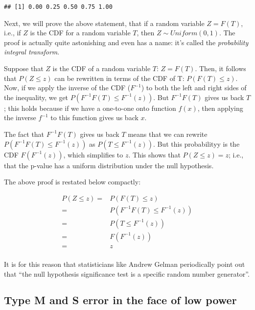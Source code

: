 \documentclass[
  12pt,
]{krantz}
\theoremstyle{definition}
\theoremstyle{definition}
\theoremstyle{definition}
\theoremstyle{definition}
\theoremstyle{remark}
\begin{document}
\begin{blackbox}
\begin{verbatim}
## [1] 0.00 0.25 0.50 0.75 1.00
\end{verbatim}

Next, we will prove the above statement, that if a random variable \(Z=F(T)\), i.e., if \(Z\) is the
CDF for a random variable \(T\), then \(Z \sim Uniform(0,1)\).
The proof is actually quite astonishing and even has a name: it's called the \emph{probability integral transform}.

Suppose that \(Z\) is the CDF of a random variable \(T\): \(Z=F(T)\). Then, it follows that \(P(Z\leq z)\) can be rewritten in terms of the CDF of T: \(P(F(T)\leq z)\). Now, if we apply the inverse of the CDF (\(F^{-1}\)) to both the left and right sides of the inequality, we get \(P(F^{-1}F(T)\leq F^{-1}(z))\).
But \(F^{-1}F(T)\) gives us back \(T\); this holds because if we have a one-to-one onto function \(f(x)\), then applying the inverse \(f^{-1}\) to this function gives us back \(x\).

The fact that \(F^{-1}F(T)\) gives us back \(T\) means that we can rewrite \(P(F^{-1}F(T)\leq F^{-1}(z))\) as \(P(T\leq F^{-1}(z) )\). But this probabilityy is the CDF \(F(F^{-1}(z))\), which simplifies to \(z\). This shows that \(P(Z\leq z) = z\); i.e., that the p-value has a uniform distribution under the null hypothesis.

The above proof is restated below compactly:

\begin{equation}
\begin{split}
P(Z\leq z) =& P(F(T)\leq z)\\
=& P(F^{-1}F(T)\leq F^{-1}(z))\\
=& P(T\leq F^{-1}(z) ) \\
=& F(F^{-1} (z))\\
=& z\\
\end{split}
\end{equation}

It is for this reason that statisticians like Andrew Gelman periodically point out that ``the null hypothesis significance test is a specific random number generator''.

\end{blackbox}

\hypertarget{type-m-and-s-error-in-the-face-of-low-power}{%
\subsection{Type M and S error in the face of low power}\label{type-m-and-s-error-in-the-face-of-low-power}}
\end{document}
